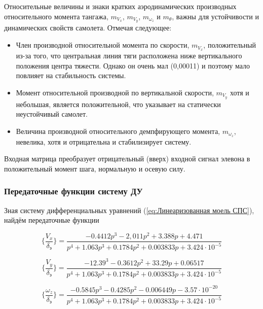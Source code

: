 Относительные величины и знаки кратких аэродинамических
производных относительного момента тангажа, $m_{V_x}$, $m_{V_y}$, $m_{\omega_z}$ и $m_\theta$, важны для устойчивости и динамических свойств
самолета. Отмечая следующее:
\begin{itemize}
\item Член производной относительной момента по скорости, $m_{V_x}$, положительный из-за того, что центральная линия тяги расположена
ниже вертикального положения центра тяжести. Однако он очень мал (0,00011) и поэтому мало повлияет на стабильность системы.
\item Момент относительной производной по вертикальной скорости, $m_{V_y}$ хотя и небольшая, является положительной, что указывает на статически
неустойчивый самолет.
\item Величина производной относительного демпфирующего момента, $m_{\omega_z}$, невелика, хотя и отрицательна и стабилизирует систему.
\end{itemize}

Входная матрица преобразует отрицательный (вверх) входной сигнал элевона в положительный момент шага, нормальную и осевую силу.

\subsubsection{Передаточные функции систему ДУ}

Зная систему дифференциальных уравнений ({\ref{eq:Линеаризованная моель СПС}}), найдём передаточные функции 

\begin{equation}
    \label{eq:ПФ по горизонтальной скорости СПС}
    \{ \frac{V_x}{\delta_\text{э}} \} = \frac{-0.4412p^3 - 2,011p^2 + 3.388p + 4.471}{p^4 + 1.063p^3 + 0.1784p^2 + 0.003833p + 3.424 \cdot 10^{-5}}
\end{equation}

\begin{equation}
    \label{eq:ПФ по вертикальной скорости СПС}
    \{ \frac{V_y}{\delta_\text{э}} \} = \frac{-12.39^3 - 0.3612p^2 + 33.29p + 0.06517}{p^4 + 1.063p^3 + 0.1784p^2 + 0.003833p + 3.424 \cdot 10^{-5}}
\end{equation}

\begin{equation}
    \label{eq:ПФ по угловой скорости тангажа СПС}
    \{ \frac{\omega_z}{\delta_\text{э}} \} = \frac{-0.5845p^3 - 0.4285p^2 - 0.006449p - 3.57 \cdot 10^{-20}}{p^4 + 1.063p^3 + 0.1784p^2 + 0.003833p + 3.424 \cdot 10^{-5}}
\end{equation}

